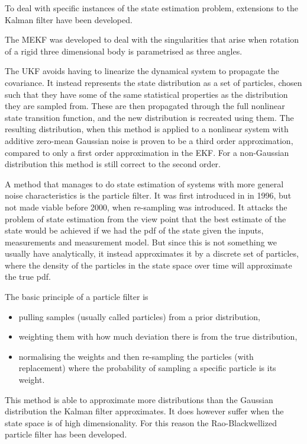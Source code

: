 To deal with specific instances of the state estimation problem, extensions to the Kalman filter have been developed. 

The \gls{MEKF}\cite{MEKF} was developed to deal with the singularities that arise when rotation of a rigid three dimensional body is parametrised as three angles. 

The \gls{UKF}\cite{UKF} avoids having to linearize the dynamical system to propagate the covariance. It instead represents the state distribution as a set of particles, chosen such that they have some of the same statistical properties as the distribution they are sampled from. These are then propagated through the full nonlinear state transition function, and the new distribution is recreated using them. The resulting distribution, when this method is applied to a nonlinear system with additive zero-mean Gaussian noise is proven to be a third order approximation, compared to only a first order approximation in the \gls{EKF}. For a non-Gaussian distribution this method is still correct to the second order.

A method that manages to do state estimation of systems with more general noise characteristics is the particle filter. It was first introduced in \cite{ParticleFilter} in 1996, but not made viable before 2000, when re-sampling was introduced\cite{ParticleResampling}. It attacks the problem of state estimation from the view point that the best estimate of the state would be achieved if we had the \gls{pdf} of the state given the inputs, measurements and measurement model. But since this is not something we usually have analytically, it instead approximates it by a discrete set of particles, where the density of the particles in the state space over time will approximate the true \gls{pdf}. 

The basic principle of a particle filter is 

\begin{itemize}
    \item pulling samples (usually called particles) from a prior distribution, 
    \item weighting them with how much deviation there is from the true distribution, 
    \item normalising the weights and then re-sampling the particles (with replacement) where the probability of sampling a specific particle is its weight. 
\end{itemize}

This method is able to approximate more distributions than the Gaussian distribution the Kalman filter approximates. It does however suffer when the state space is of high dimensionality. For this reason the Rao-Blackwellized particle filter has been developed.

